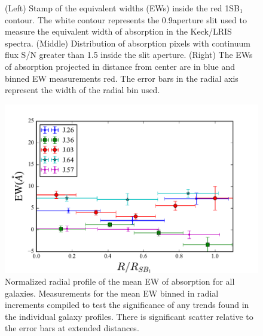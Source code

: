 \documentclass[twocolumn]{aastex61}
\begin{document}
\begin{figure}
\centering
{}
\caption{(Left) Stamp of the equivalent widths (EWs) inside the red 1SB$_1$ contour. The white contour represents the 0.9\arcsec aperture slit used to measure the equivalent width of absorption in the Keck/LRIS spectra. (Middle) Distribution of absorption pixels with continuum flux S/N greater than 1.5 inside the slit aperture. (Right) The EWs of absorption projected in distance from center are in blue and binned EW measurements red. The error bars in the radial axis represent the width of the radial bin used.}
\label{fig:ews}
\end{figure}


\begin{figure}[!htb]
\centering
\includegraphics[scale=0.9]{../Figures/ew_comb.pdf}
\caption{Normalized radial profile of the mean EW of  absorption for all galaxies. Measurements for the mean EW binned in radial increments compiled to test the significance of any trends found in the individual galaxy profiles. There is significant scatter relative to the error bars at extended distances.}
\label{fig:ew_comb}
\end{figure}
\end{document}
